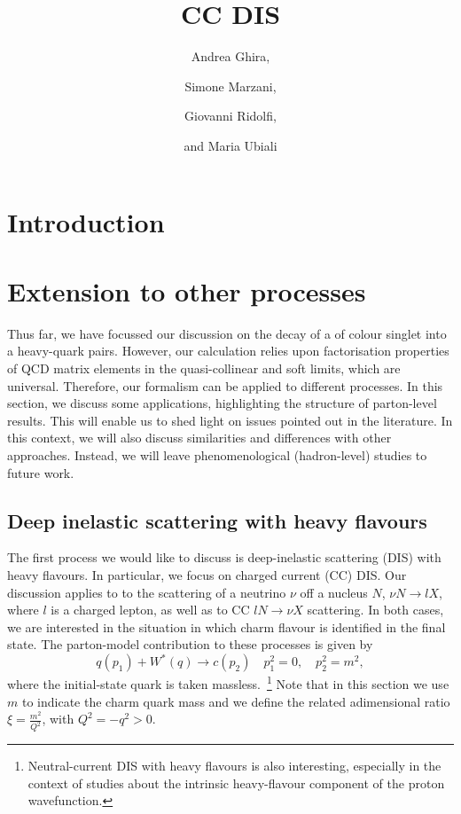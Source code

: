 \documentclass[letterpaper,11pt]{article}
\title{
CC DIS
}
\author[1]{Andrea Ghira,}
\author[1]{Simone Marzani,}
\author[1]{Giovanni Ridolfi,}
\author[2]{and Maria Ubiali}
\affiliation[1]{Dipartimento di Fisica, Universit\`a di Genova and INFN, Sezione di Genova,Via Dodecaneso 33, 16146, Italy}
\affiliation[2]{DAMTP, University of Cambridge, Wilberforce Road, Cambridge, CB3 0WA, United Kingdom}
\begin{document}
\maketitle


\section{Introduction}\label{sec:intro}


\section{Extension to other processes}\label{sec:extensions}

Thus far, we have focussed our discussion on the decay of a of colour singlet into a heavy-quark pairs. However, our calculation relies upon factorisation properties of QCD matrix elements in the quasi-collinear and soft limits, which are universal. Therefore, our formalism can be applied to different processes. In this section, we discuss some applications, highlighting the structure of parton-level results. This will enable us to shed light on issues pointed out in the literature. In this context, we will also discuss similarities and differences with other approaches. 
%
Instead, we will leave phenomenological (hadron-level) studies to future work.

\subsection{Deep inelastic scattering with heavy flavours}\label{sec:dis}

The first process we would like to discuss is deep-inelastic scattering (DIS) with heavy flavours. In particular, we focus on charged current (CC) DIS. Our discussion applies to to the scattering of a neutrino $\nu$ off a nucleus $N$, $\nu N \to l X$, where $l$ is a charged lepton, as well as to CC  $l N \to \nu X$ scattering. In both cases, we are interested in the situation in which charm flavour is identified in the final state. The parton-model contribution to these processes is given by
\begin{equation}
	q(p_1)+W^*(q)\to c (p_2)\quad p_1^2=0,\quad p_2^2=m^2,
\end{equation}
where the initial-state quark is taken massless.~\footnote{Neutral-current DIS with heavy flavours is also interesting, especially in the context  of studies about the intrinsic heavy-flavour component of the proton wavefunction.} Note that in this section we use $m$ to indicate the charm quark mass and we define the related adimensional ratio $\xi=\frac{m^2}{Q^2}$, with $Q^2=-q^2>0$.
\end{document}
